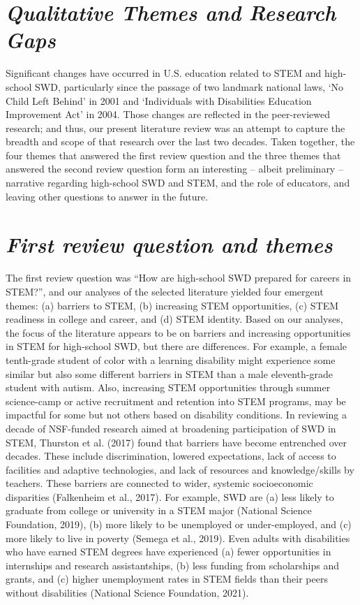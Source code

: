 \documentclass[11pt]{sig-alternate}
\begin{document}
\begin{large}
\section*{\textit{Qualitative Themes and Research Gaps}}
Significant changes have occurred in U.S. education related to STEM and high-school SWD, particularly since the passage of two landmark national laws, ‘No Child Left Behind’ in 2001 and ‘Individuals with Disabilities Education Improvement Act’ in 2004. Those changes are reflected in the peer-reviewed research; and thus, our present literature review was an attempt to capture the breadth and scope of that research over the last two decades. Taken together, the four themes that answered the first review question and the three themes that answered the second review question form an interesting – albeit preliminary – narrative regarding high-school SWD and STEM, and the role of educators, and leaving other questions to answer in the future. 

\section*{\textit{First review question and themes}}
The first review question was “How are high-school SWD prepared for careers in STEM?”, and our analyses of the selected literature yielded four emergent themes: (a) barriers to STEM, (b) increasing STEM opportunities, (c) STEM readiness in college and career, and (d) STEM identity. Based on our analyses, the focus of the literature appears to be on barriers and increasing opportunities in STEM for high-school SWD, but there are differences. For example, a female tenth-grade student of color with a learning  disability might experience some similar but also some different barriers in STEM than a male eleventh-grade student with autism. Also, increasing STEM opportunities through summer science-camp or active recruitment and retention into STEM programs, may be impactful for some but not others based on disability conditions. In reviewing a decade of NSF-funded research aimed at broadening participation of SWD in STEM, Thurston et al. (2017) found that barriers have become entrenched over decades. These include discrimination, lowered expectations, lack of access to facilities and adaptive technologies, and lack of resources and knowledge/skills by teachers. These barriers are connected to wider, systemic socioeconomic disparities (Falkenheim et al., 2017). For example, SWD are (a) less likely to graduate from college or university in a STEM major (National Science Foundation, 2019), (b) more likely to be unemployed or under-employed, and (c) more likely to live in poverty (Semega et al., 2019). Even adults with disabilities who have earned STEM degrees have experienced (a) fewer opportunities in internships and research assistantships, (b) less funding from scholarships and grants, and (c) higher unemployment rates in STEM fields than their peers without disabilities (National Science Foundation, 2021). 


\end{large}
\end{document}
